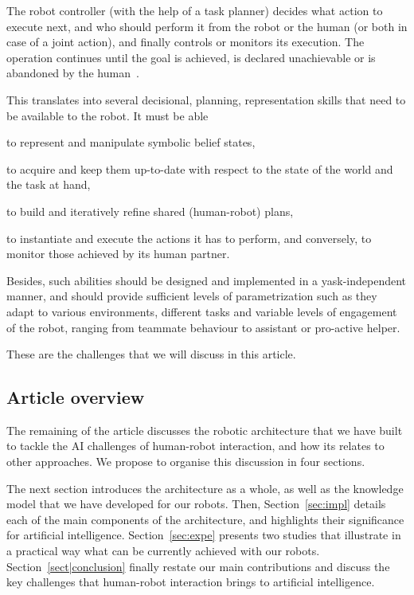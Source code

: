 \documentclass[preprint,3p,times]{elsarticle}
\begin{document}
The robot controller (with the help of a task planner) decides what action to
execute next, and who should perform it from the robot or the human (or both in
case of a joint action), and finally controls or monitors its execution. The
operation continues until the goal is achieved, is declared unachievable or is
abandoned by the human~\cite{Klein2004}.

\begin{inparaenum}

This translates into several decisional, planning, representation skills that
need to be available to the robot. It must be able \item to represent and
manipulate symbolic belief states, \item to acquire and keep them up-to-date
with respect to the state of the world and the task at hand, \item to build and
iteratively refine shared (human-robot) plans, \item to instantiate and execute
the actions it has to perform, and conversely, to monitor those achieved by
its human partner.

\end{inparaenum}

Besides, such abilities should be designed and implemented in a yask-independent
manner, and should provide sufficient levels of parametrization such as they adapt to
various environments, different tasks and variable levels of engagement of the
robot, ranging from teammate behaviour to assistant or pro-active helper.

These are the challenges that we will discuss in this article.

\subsection{Article overview}

The remaining of the article discusses the robotic architecture that we have built to
tackle the AI challenges of human-robot interaction, and how its relates to
other approaches. We propose to organise this discussion in four sections.

The next section introduces the architecture as a whole, as well as the
knowledge model that we have developed for our robots. Then,
Section~\ref{sec:impl} details each of the main components of the
architecture, and highlights their significance for artificial
intelligence. Section~\ref{sec:expe} presents two studies that illustrate in a
practical way what can be currently achieved with our robots.
Section~\ref{sect|conclusion} finally restate our main contributions and discuss
the key challenges that human-robot interaction brings to artificial
intelligence.
\end{document}
